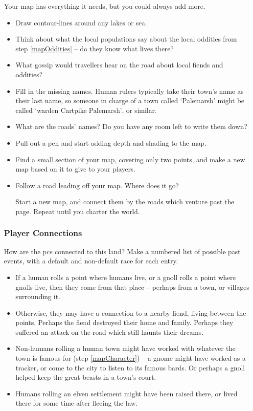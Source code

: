\begin{multicols}{2}

Your map has everything it needs, but you could always add more.

\begin{itemize}
  \item
  Draw contour-lines around any lakes or sea.
  \item
  Think about what the local populations say about the local oddities from step \ref{mapOddities} -- do they know what lives there?
  \item
  What gossip would travellers hear on the road about local fiends and oddities?
  \item
  Fill in the missing names.
  Human rulers typically take their town's name as their last name, so someone in charge of a town called `Palemarsh' might be called  `\Gls{warden} Cartpike Palemarsh', or similar.
  \item
  What are the roads' names?
  Do you have any room left to write them down?
  \item
  Pull out a pen and start adding depth and shading to the map.
  \item
  Find a small section of your map, covering only two points, and make a new map based on it to give to your players.
  \item
  Follow a road leading off your map.
  Where does it go?

  Start a new map, and connect them by the roads which venture past the page.
  Repeat until you charter the world.
\end{itemize}

\bigLine

\subsubsection{Player Connections}

How are the \glspl{pc} connected to this land?
Make a numbered list of possible past events, with a default and non-default race for each entry.

\begin{itemize}
  \item
  If a human rolls a point where humans live, or a gnoll rolls a point where gnolls live, then they come from that place -- perhaps from a town, or \glspl{village} surrounding it.
  \item
  Otherwise, they may have a connection to a nearby fiend, living between the points.
  Perhaps the fiend destroyed their home and family.
  Perhaps they suffered an attack on the road which still haunts their dreams.
  \item
  Non-humans rolling a human town might have worked with whatever the town is famous for (step \vref{mapCharacter}) -- a gnome might have worked as a tracker, or come to the city to listen to its famous bards.
  Or perhaps a gnoll helped keep the great beasts in a town's \gls{court}.
  \item
  Humans rolling an elven settlement might have been raised there, or lived there for some time after fleeing the law.
\end{itemize}


\end{multicols}
